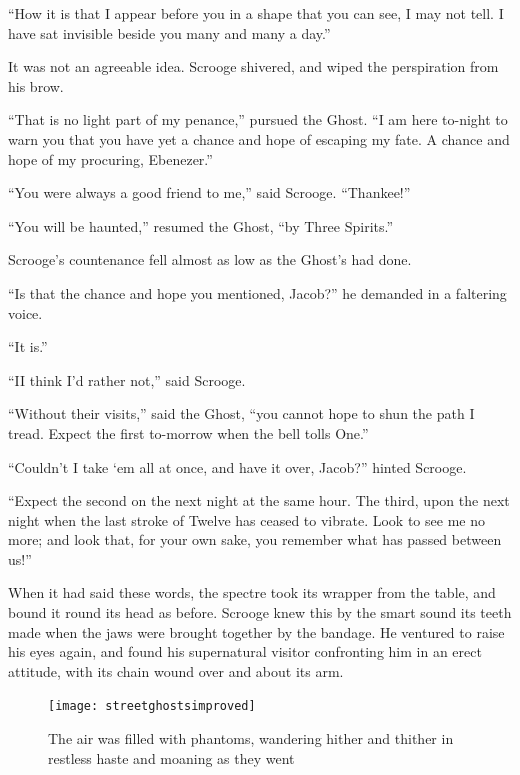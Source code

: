 \documentclass[paper=5.5in:8.5in,BCOR=7mm,twoside,DIV=calc,12pt,usegeometry]{scrbook} %
\begin{document}
\enquote{How it is that I appear before you in a shape that you can see, I may not tell. I have sat invisible beside you many and many a day.}

It was not an agreeable idea. Scrooge shivered, and wiped the perspiration from his brow.

\enquote{That is no light part of my penance,} pursued the Ghost. \enquote{I am here to-night to warn you that you have yet a chance and hope of escaping my fate. A chance and hope of my procuring, Ebenezer.}

\enquote{You were always a good friend to me,} said Scrooge. \enquote{Thankee!}

\enquote{You will be haunted,} resumed the Ghost, \enquote{by Three Spirits.}




Scrooge's countenance fell almost as low as the Ghost's had done.

\enquote{Is that the chance and hope you mentioned, Jacob?} he demanded in a faltering voice.

\enquote{It is.}

\enquote{I\textemdash I think I'd rather not,} said Scrooge.

\enquote{Without their visits,} said the Ghost, \enquote{you cannot hope to shun the path I tread. Expect the first to-morrow when the bell tolls One.}

\enquote{Couldn't I take `em all at once, and have it over, Jacob?} hinted Scrooge.

\enquote{Expect the second on the next night at the same hour. The third, upon the next night when the last stroke of Twelve has ceased to vibrate. Look to see me no more; and look that, for your own sake, you remember what has passed between us!}

When it had said these words, the spectre took its wrapper from the table, and bound it round its head as before. Scrooge knew this by the smart sound its teeth made when the jaws were brought together by the bandage. He ventured to raise his eyes again, and found his supernatural visitor confronting him in an erect attitude, with its chain wound over and about its arm.

\begin{figure}[p]
\begin{minipage}[c]{\linewidth}
\texttt{[image: streetghostsimproved]}
\caption[The air was filled with phantoms]{The air was filled with phantoms, wandering hither and thither in restless haste and moaning as they went}
\end{minipage}
\end{figure}
\end{document}
